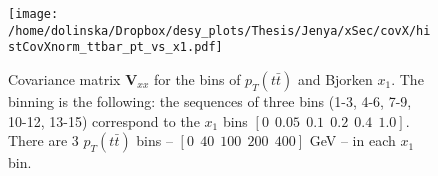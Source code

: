 \begin{figure}[p]
  \centering
  \texttt{[image: /home/dolinska/Dropbox/desy\_plots/Thesis/Jenya/xSec/covX/histCovXnorm\_ttbar\_pt\_vs\_x1.pdf]}
  \caption{Covariance matrix $\mathbf{V}_{xx}$ for the bins of $p_{T}(t\bar{t})$ and Bjorken $x_{1}$. The binning is the following:
  the sequences of three bins (1-3, 4-6, 7-9, 10-12, 13-15) correspond to the $x_{1}$ bins $[0\:\:0.05\:\:0.1\:\:0.2\:\:0.4\:\:1.0]$.
          There are 3 $p_{T}(t\bar{t})$ bins -- $[0\:\:40\:\:100\:\:200\:\:400]$ GeV -- in each $x_{1}$ bin.}
  \label{fig:corr_matr_x1_pttt}
\end{figure}